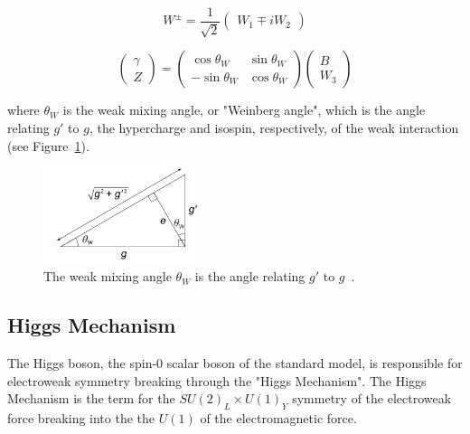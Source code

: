 \begin{equation}
	W^{\pm} = \frac{1}{\sqrt{2}}
	\begin{pmatrix}
		W_1 \mp iW_2
	\end{pmatrix}
	\label{eq:w}
\end{equation}


\begin{equation}
	\begin{pmatrix}
		\gamma \\
		Z 
	\end{pmatrix} = \begin{pmatrix}
		\cos{\theta_W} & \sin{\theta_W} \\
		-\sin{\theta_W} & \cos{\theta_W}
	\end{pmatrix}
	\begin{pmatrix}
		B \\
		W_3 
	\end{pmatrix}
	\label{eq:zgamma}
\end{equation}

where $\theta_W$ is the weak mixing angle, or "Weinberg angle", which is the angle relating $g'$ to $g$, the hypercharge and isospin, respectively, of the weak interaction (see Figure~\ref{fig:weinberg}).

\begin{figure}[htbp!]
	\centering
	\includegraphics[width=0.4\textwidth]{figures/Weinberg_angle.png}
	\caption{The weak mixing angle $\theta_W$ is the angle relating $g'$ to $g$~\cite{Weinberg_Angle}.}
	\label{fig:weinberg}
\end{figure}


\subsection*{Higgs Mechanism}

The Higgs boson, the spin-0 scalar boson of the standard model, is responsible for electroweak symmetry breaking through the "Higgs Mechanism". The Higgs Mechanism is the term for the $SU(2)_L \times U(1)_Y$ symmetry of the electroweak force breaking into the the $U(1)$ of the electromagnetic force.


